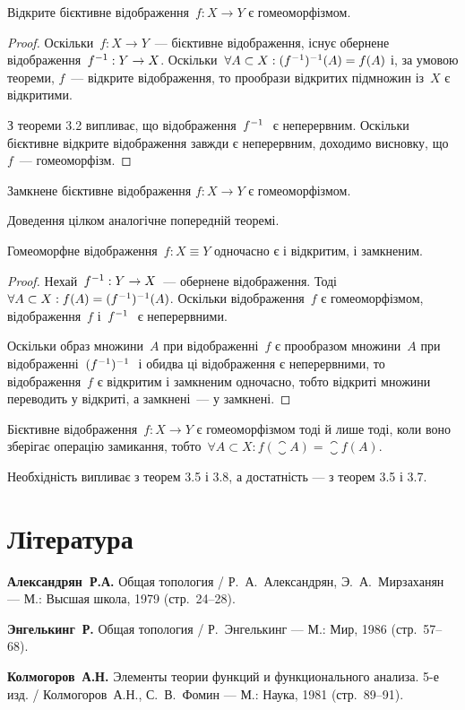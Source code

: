\begin{theorem}
Відкрите бієктивне відображення~$f: X \to Y$ є гомеоморфізмом.
\end{theorem}

\begin{proof}
Оскільки~$f: X \to Y$~--- бієктивне
відображення, існує обернене відображення~$f^{-1} : Y \to X$.
Оскільки~$\forall A \subset X: (f^{-1} )^{-1}(A) = f(A)$ і, за умовою теореми,
$f$~--- відкрите відображення, то прообрази відкритих
підмножин із~$X$ є відкритими.

З теореми 3.2 випливає, що
відображення~$f^{-1}~$ є неперервним. Оскільки бієктивне
відкрите відображення завжди є неперервним, доходимо
висновку, що~$f$~--- гомеоморфізм.
\end{proof}

\begin{theorem}
Замкнене бієктивне відображення
$f: X \to Y$ є гомеоморфізмом.
\end{theorem}

Доведення цілком аналогічне попередній теоремі.

\begin{theorem}
Гомеоморфне відображення~$f: X \equiv Y$ одночасно є і відкритим, і замкненим.
\end{theorem}

\begin{proof}
Нехай~$f^{-1} : Y \to X$~--- обернене відображення.
Тоді~$\forall A \subset X: f(A) = (f^{-1} )^{-1}(A)$.
Оскільки відображення~$f$ є гомеоморфізмом, відображення~$f$ і~$f^{-1}~$
є неперервними.

Оскільки образ множини~$A$ при відображенні~$f$ є прообразом
множини~$A$ при відображенні~$(f^{-1} )^{-1}~$ і обидва ці
відображення є неперервними, то відображення~$f$ є
відкритим і замкненим одночасно, тобто відкриті множини
переводить у відкриті, а замкнені~--- у замкнені.
\end{proof}

\begin{theorem}
Бієктивне відображення~$f: X \to Y$ є
гомеоморфізмом тоді й лише тоді, коли воно зберігає
операцію замикання, тобто~$\forall A \subset X: f(\closure{A}) = \closure{f(A)}$.
\end{theorem}

Необхідність випливає з теорем 3.5 і 3.8, а достатність ---
з теорем 3.5 і 3.7.

\section{Література}

\begin{enumerate}[label={[\arabic*]}]
\item \textbf{Александрян~Р.А.}
Общая топология /
Р.~А.~Александрян, Э.~А.~Мирзаханян ---
М.: Высшая школа, 1979 (стр.~24--28).
\item \textbf{Энгелькинг~Р.}
Общая топология /
Р.~Энгелькинг ---
М.: Мир, 1986 (стр.~57--68).
\item \textbf{Колмогоров~А.Н.}
Элементы теории функций и функционального анализа. 5-е изд. /
Колмогоров~А.Н., С.~В.~Фомин ---
М.: Наука, 1981 (стр.~89--91).
\end{enumerate}